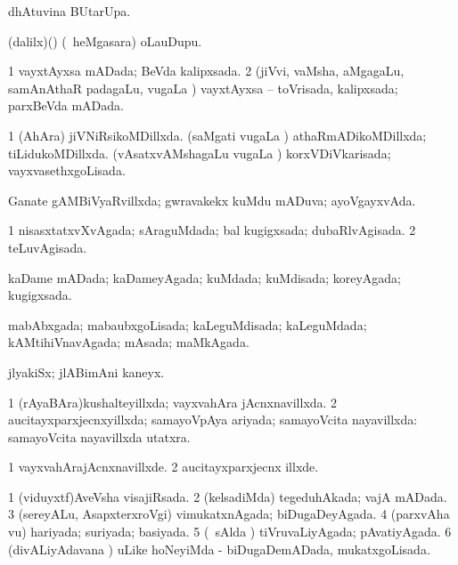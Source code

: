 {\bentry
{} 
\gl{\kirx}
\bmng
  dhAtuvina BUtarUpa. 
\emng
\eentry

\bentry
{} 
\gl{\nA}
\expl{}
\bmng
 (\bava dalilx)(\AmA) (\kanmu\ heMgasara) oLauDupu. 
\emng
\eentry

\bentry
{} 
\gl{\gu}
\expl{}
\bmng
\bnum
\num{1} vayxtAyxsa mADada; BeVda kalipxsada. 
\num{2} (jiVvi, vaMsha, aMgagaLu, samAnAthaR padagaLu, \mo vugaLa \vi) vayxtAyxsa -- toVrisada, kalipxsada; parxBeVda mADada. 
\enum
\emng
\eentry

\bentry
{} 
\gl{\gu}
\expl{}
\bmng
\bnum
\num{1} (AhAra) jiVNiRsikoMDillxda. 
\banum
{} (saMgati \mo vugaLa \vi) athaRmADikoMDillxda; tiLidukoMDillxda. 
 (vAsatxvAMshagaLu \mo vugaLa \vi) korxVDiVkarisada; vayxvasethxgoLisada. 
\eanum
\numie
\enum
\emng
\eentry

\bentry
{} 
\gl{\gu}
\expl{}
\bmng
 Ganate gAMBiVyaRvillxda; gwravakekx kuMdu mADuva; ayoVgayxvAda. 
\emng
\eentry

\bentry
{} 
 \gl{\gu} \bmng
\bnum
\num{1} nisasxtatxvXvAgada; sAraguMdada; bal kugigxsada; dubaRlvAgisada. 
\num{2} teLuvAgisada. 
\enum
\emng
\eentry

\bentry
{} 
\gl{\gu}
\expl{}
\bmng
 kaDame mADada; kaDameyAgada; kuMdada; kuMdisada; koreyAgada; kugigxsada. 
\emng
\eentry

\bentry
{} 
\gl{\gu}
\expl{}
\bmng
 mabAbxgada; mabaubxgoLisada; kaLeguMdisada; kaLeguMdada; kAMtihiVnavAgada; mAsada; maMkAgada. 
\emng
\eentry

\bentry
{} 
\gl{\nA}
\expl{}
\bmng
 jlyakiSx; jlABimAni kaneyx. 
\emng
\eentry

\bentry
{} 
\gl{\gu}
\expl{}
\bmng
\bnum
\num{1} (rAyaBAra)kushalteyillxda; vayxvahAra jAcnxnavillxda. 
\num{2} aucitayxparxjecnxyillxda; samayoVpAya ariyada; samayoVcita nayavillxda:  samayoVcita nayavillxda utatxra. 
\enum
\emng
\eentry

\bentry
{} 
\gl{\kirxvi}
\expl{}
\bmng
\bnum
\num{1} vayxvahArajAcnxnavillxde. 
\num{2} aucitayxparxjecnx illxde. 
\enum
\emng
\eentry

\bentry
{} 
\gl{\gu}
\expl{}
\bmng
\bnum
\num{1} (viduyxtf)AveVsha visajiRsada. 
\num{2} (kelsadiMda) tegeduhAkada; vajA mADada. 
\num{3} (sereyALu, AsapxterxroVgi) vimukatxnAgada; biDugaDeyAgada. 
\num{4} (parxvAha \mo vu) hariyada; suriyada; basiyada. 
\num{5} (\kanmu\ sAlda \vi) tiVruvaLiyAgada; pAvatiyAgada. 
\num{6} (divALiyAdavana \vi) uLike hoNeyiMda - biDugaDemADada, mukatxgoLisada. 
\enum
\emng
\eentry

}
